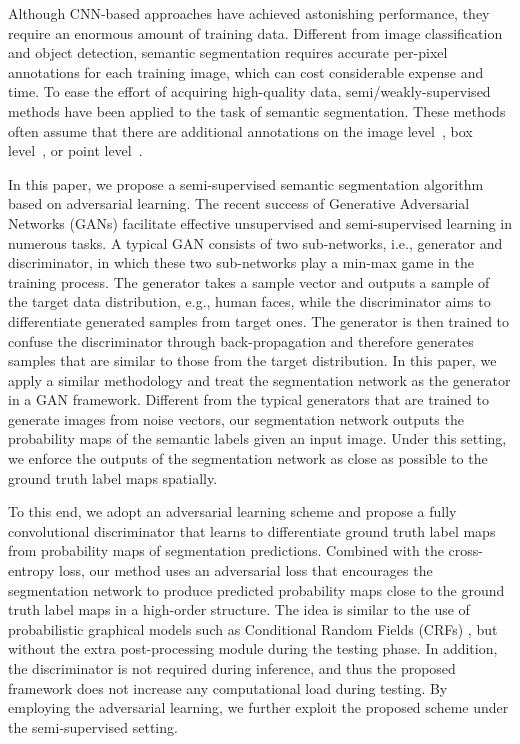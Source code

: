 \documentclass{bmvc2k}
\begin{document}
	Although CNN-based approaches have achieved astonishing performance, they require an enormous amount of training data.
	Different from image classification and object detection, semantic segmentation requires accurate per-pixel annotations for each training image, which can cost considerable expense and time.
	To ease the effort of acquiring high-quality data, semi/weakly-supervised methods have been applied to the task of semantic segmentation.
	These methods often assume that there are additional annotations on the image level~\cite{pinheiro2015weakly, papandreou2015weakly, hong2015decoupled, qi2016augmented, pathak2015constrained}, box level~\cite{dai2015boxsup}, or point level~\cite{bearman2016s}.
	
	
	In this paper, we propose a semi-supervised semantic segmentation algorithm based on adversarial learning.
	The recent success of Generative Adversarial Networks (GANs) \cite{gan} 
	facilitate effective unsupervised and semi-supervised learning in numerous tasks. 
	A typical GAN consists of two sub-networks, i.e., generator and discriminator, in which these two sub-networks play a min-max game in the training process. The generator takes a sample vector and outputs a sample of the target data distribution, e.g., human faces,
	while the discriminator aims to differentiate generated samples from target ones.
	The generator is then trained to confuse the discriminator through back-propagation and therefore generates samples that are similar to those from the target distribution.
	In this paper, we apply a similar methodology and treat the segmentation network as the generator in a GAN framework.
	Different from the typical generators that are trained to generate images from noise vectors, our segmentation network outputs the probability maps of the semantic labels given an input image.
	Under this setting, we enforce the outputs of the segmentation network as close as possible to the ground truth label maps spatially.
	
	
	To this end, we adopt an adversarial learning scheme and propose a fully convolutional discriminator that learns to differentiate ground truth label maps from probability maps of segmentation predictions.
	Combined with the cross-entropy loss, our method uses an adversarial loss that encourages the segmentation network to produce predicted probability maps close to the ground truth label maps in a high-order structure.
	The idea is similar to the use of probabilistic graphical models such as Conditional Random Fields (CRFs) \cite{crfasrnn,deeplab,piecewise}, but without the extra post-processing module during the testing phase.
	In addition, the discriminator is not required during inference, and thus the proposed framework does not increase any computational load during testing.
	By employing the adversarial learning, we further exploit the proposed scheme under the semi-supervised setting.
	
\end{document}
